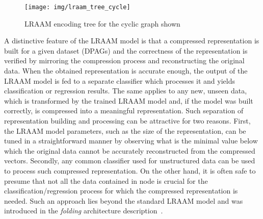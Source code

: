 \begin{figure}
\begin{center}
	\texttt{[image: img/lraam\_tree\_cycle]}
	\caption{LRAAM encoding tree for the cyclic graph shown}
	\label{fig:lraam_tree_cycle}
\end{center}
\end{figure}

A distinctive feature of the LRAAM model is that a compressed representation is built for a given dataset (DPAGs) and the correctness of the representation is verified by mirroring the compression process and reconstructing the original data. When the obtained representation is accurate enough, the output of the LRAAM model is fed to a separate classifier which processes it and yields classification or regression results. The same applies to any new, unseen data, which is transformed by the trained LRAAM model and, if the model was built correctly, is compressed into a meaningful representation. Such separation of representation building and processing can be attractive for two reasons. First, the LRAAM model parameters, such as the size of the representation, can be tuned in a straightforward manner by observing what is the minimal value below which the original data cannot be accurately reconstructed from the compressed vectors. Secondly, any common classifier used for unstructured data can be used to process such compressed representation. On the other hand, it is often safe to presume that not all the data contained in node is crucial for the classification/regression process for which the compressed representation is needed. Such an approach lies beyond the standard LRAAM model and was introduced in the \emph{folding} architecture description~\cite{kuchler1996inductive}.



